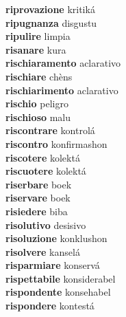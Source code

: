 \textbf{riprovazione } kritiká \\
\textbf{ripugnanza } disgustu \\
\textbf{ripulire } limpia \\
\textbf{risanare } kura \\
\textbf{rischiaramento } aclarativo \\
\textbf{rischiare } chèns \\
\textbf{rischiarimento } aclarativo \\
\textbf{rischio } peligro \\
\textbf{rischioso } malu \\
\textbf{riscontrare } kontrolá \\
\textbf{riscontro } konfirmashon \\
\textbf{riscotere } kolektá \\
\textbf{riscuotere } kolektá \\
\textbf{riserbare } boek \\
\textbf{riservare } boek \\
\textbf{risiedere } biba \\
\textbf{risolutivo } desisivo \\
\textbf{risoluzione } konklushon \\
\textbf{risolvere } kanselá \\
\textbf{risparmiare } konservá \\
\textbf{rispettabile } konsiderabel \\
\textbf{rispondente } konsehabel \\
\textbf{rispondere } kontestá \\
